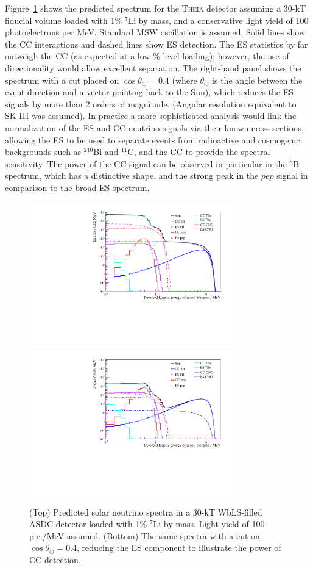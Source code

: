 Figure~\ref{f:solarspec} shows the predicted spectrum for the \textsc{Theia} detector assuming a 30-kT fiducial volume loaded with 1\% $^7$Li by mass, and a conservative light yield of 100 photoelectrons per MeV.  Standard MSW oscillation is assumed.  Solid lines show the CC interactions and dashed lines show ES detection.  The ES statistics by far outweigh the CC (as expected at a low \%-level loading); however, the use of directionality would allow excellent separation.  The right-hand panel shows the spectrum with a cut placed on $\cos\theta_{\odot}=0.4$ (where $\theta_{\odot}$ is the angle between the event direction and a vector pointing back to the Sun), which reduces the ES signals by more than 2 orders of magnitude.  (Angular resolution equivalent to SK-III was assumed).  In practice a more sophisticated analysis would link the normalization of the ES and CC neutrino signals via their known cross sections, allowing the ES to be used to separate events from radioactive and cosmogenic backgrounds such as $^{210}$Bi and $^{11}$C, and the CC to provide the spectral sensitivity.  The power of the CC signal can be observed in particular in the $^8$B spectrum, which has a distinctive shape, and the strong peak in the $pep$ signal in comparison to the broad ES spectrum.


\begin{figure}[!ht]
\begin{center}
\includegraphics[width=3.5in]{solar/TotalSpectrum.pdf}
\includegraphics[width=3.5in]{solar/TotalSpectrumCut.pdf}
\caption{(Top) Predicted solar neutrino spectra in a 30-kT WbLS-filled ASDC detector loaded with 1\% $^7$Li by mass.  Light yield of 100 p.e./MeV assumed.  (Bottom) The same spectra with a cut on $\cos\theta_{\odot}=0.4$, reducing the ES component to illustrate the power of CC detection.
\label{f:solarspec}}
\end{center}
\vspace{-1.\baselineskip}
\end{figure}

